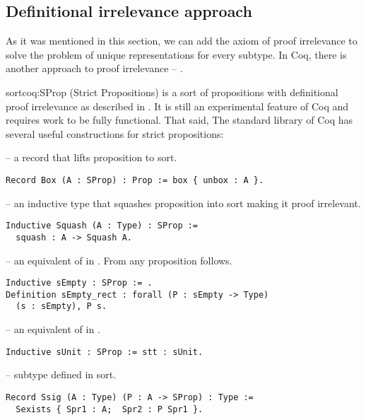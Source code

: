 \subsection{Definitional irrelevance approach}
As it was mentioned in this section, we can add the axiom of proof irrelevance to solve the problem of unique representations for every subtype. In Coq, there is another approach to proof irrelevance -- .
\begin{coq}[]{ sort}{coq:SProp}
 (Strict Propositions) is a sort of propositions with definitional proof irrelevance as described in \cite{BasesOfSProp}. It is still an experimental feature \cite{coqDoc} of Coq and requires work to be fully functional. That said, The standard library of Coq has several useful constructions for strict propositions:
\begin{description}
    \item {} -- a record that lifts  proposition to  sort.
    \begin{verbatim}
Record Box (A : SProp) : Prop := box { unbox : A }.
    \end{verbatim}
    \item {} -- an inductive type that squashes proposition into  sort making it proof irrelevant.
    \begin{verbatim}
Inductive Squash (A : Type) : SProp :=  
  squash : A -> Squash A.
    \end{verbatim}
    \item {} -- an equivalent of  in . From  any proposition follows.
    \begin{verbatim}
Inductive sEmpty : SProp := .
Definition sEmpty_rect : forall (P : sEmpty -> Type) 
  (s : sEmpty), P s.
    \end{verbatim}
    \item {} -- an equivalent of  in .
    \begin{verbatim}
Inductive sUnit : SProp := stt : sUnit.
    \end{verbatim}
    \item {} -- subtype defined in  sort.
    \begin{verbatim}
Record Ssig (A : Type) (P : A -> SProp) : Type :=
  Sexists { Spr1 : A;  Spr2 : P Spr1 }.
    \end{verbatim}
\end{description}
\end{coq}
